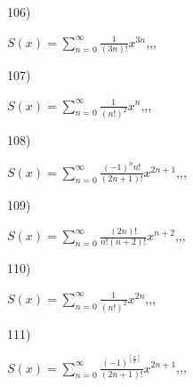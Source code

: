 \documentclass[11pt, ukrainian]{article}
\begin{document}
\par
\vspace{0.9cm}
106) \space 
{%
{$S(x)=\sum\limits_{n=0}^{\infty}{\frac{1}{(3n)!}}{x^{{3n}}}$},,, \par \smallskip  
}
\par
\vspace{0.9cm}
107) \space 
{%
{$S(x)=\sum\limits_{n=0}^{\infty}{\frac{1}{(n!)^2}}{x^{{n}}}$},,, \par \smallskip  
}
\par
\vspace{0.9cm}
108) \space 
{%
{$S(x)=\sum\limits_{n=0}^{\infty}{\frac{{(-1)^n}{n!}}{(2n+1)!}}{x^{{2n+1}}}$},,, \par \smallskip  
}
\par
\vspace{0.9cm}
109) \space 
{%
{$S(x)=\sum\limits_{n=0}^{\infty}{\frac{(2n)!}{n!(n+2)!}}{x^{{n+2}}}$},,, \par \smallskip  
}
\par
\vspace{0.9cm}
110) \space 
{%
{$S(x)=\sum\limits_{n=0}^{\infty}{\frac{1}{(n!)^2}}{x^{{2n}}}$},,, \par \smallskip  
}
\par
\newpage
111) \space 
{%
{$S(x)=\sum\limits_{n=0}^{\infty}{\frac{(-1)^{[\frac{n}{2}]}}{(2n+1)!}}{x^{{2n+1}}}$},,, \par \smallskip  
}
\end{document}

